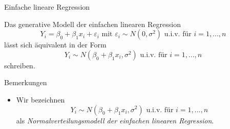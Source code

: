 \documentclass[
  8pt,
  ignorenonframetext,
]{beamer}
\providecommand{\tightlist}{%
  \setlength{\itemsep}{0pt}\setlength{\parskip}{0pt}}
\begin{document}
\begin{frame}{Einfache lineare Regression}
\protect\hypertarget{einfache-lineare-regression-2}{}
\small
\begin{theorem}
\normalfont
\justifying
Das generative Modell der einfachen linearen Regression
\begin{equation}\label{eq:modell}
Y_i = \beta_0 + \beta_1x_i + \varepsilon_{i} \mbox{ mit } \varepsilon_i \sim N(0,\sigma^2) \mbox{ u.i.v. für } i = 1,...,n
\end{equation}
lässt sich äquivalent in der Form
\begin{equation}\label{eq:modell_normal}
Y_i \sim N\left(\beta_0 + \beta_1x_i, \sigma^2\right) \mbox{ u.i.v. für } i = 1,...,n
\end{equation}
schreiben.
\end{theorem}

\footnotesize

Bemerkungen

\begin{itemize}
\tightlist
\item
  Wir bezeichnen \begin{equation}
  Y_i \sim N\left(\beta_0 + \beta_1x_i, \sigma^2\right) \mbox{ u.i.v. für } i = 1,...,n
  \end{equation} als
  \textit{Normalverteilungsmodell der einfachen linearen Regression}.
\end{itemize}
\end{frame}
\end{document}
